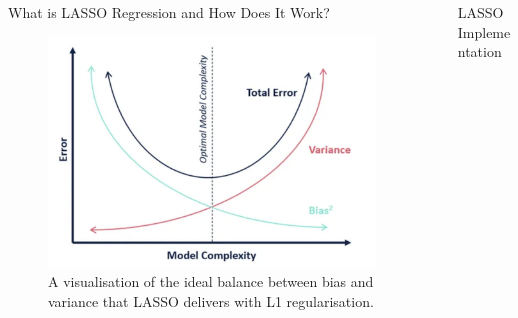 \documentclass[final]{beamer}
\newlength{\sepwid}
\newlength{\onecolwid}
\newlength{\twocolwid}
\begin{document}
\begin{frame}[t]
\begin{columns}[t]
\begin{column}{\onecolwid}
\begin{block}{What is LASSO Regression and How Does It Work?}
\begin{figure}
    \centering
    \includegraphics[width=0.65\linewidth]{Bias.Variance.TO1.pdf}
    \caption{\; A visualisation of the ideal balance between bias and variance that LASSO delivers with L1 regularisation.}
\end{figure}
\end{block}

\end{column} %

\begin{column}{\sepwid}\end{column} %

\begin{column}{\twocolwid} %

\vspace{-1.25cm}

\begin{block}{LASSO Implementation}


\end{block}
\end{column}
\end{columns}
\end{frame}
\end{document}
